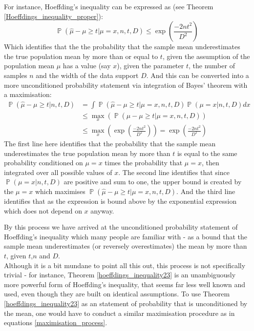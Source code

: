 \documentclass[12pt]{colt2020} %
\DeclareMathOperator{\p}{\mathbb{P}}
\begin{document}
For instance, Hoeffding's inequality can be expressed as (see Theorem \ref{Hoeffdings_inequality_proper}):
$$\p(\hat{\mu}-\mu\ge t|\mu=x,n,t,D)\le \exp\left(\frac{-2nt^2}{D^2}\right)$$
Which identifies that the the probability that the sample mean underestimates the true population mean by more than or equal to $t$, given the assumption of the population mean $\mu$ has a value (say $x$), given the parameter $t$, the number of samples $n$ and the width of the data support $D$.
And this can be converted into a more unconditioned probability statement via integration of Bayes' theorem with a maximisation:
\begin{align}\label{maximisation_process}\p(\hat{\mu}-\mu\ge t|n,t,D)& = \int\p(\hat{\mu}-\mu\ge t|\mu=x,n,t,D)\p(\mu=x|n,t,D)dx\nonumber\\
&\le \max_x\left(\p(\hat{\mu}-\mu\ge t|\mu=x,n,t,D)\right)\nonumber\\
&\le \max_x\left(\exp\left(\frac{-2nt^2}{D^2}\right)\right) = \exp\left(\frac{-2nt^2}{D^2}\right)\end{align}
The first line here identifies that the probability that the sample mean underestimates the true population mean by more than $t$ is equal to the same probability conditioned on $\mu=x$ times the probability that $\mu=x$, then integrated over all possible values of $x$.
The second line identifies that since $\p(\mu=x|n,t,D)$ are positive and sum to one, the upper bound is created by the $\mu=x$ which maximises $\p(\hat{\mu}-\mu\ge t|\mu=x,n,t,D)$.
And the third line identifies that as the expression is bound above by the exponential expression which does not depend on $x$ anyway. 

By this process we have arrived at the unconditioned probability statement of Hoeffding's inequality which many people are familiar with - as a bound that the sample mean underestimates (or reversely overestimates) the mean by more than $t$, given $t$,$n$ and $D$.\\

Although it is a bit mundane to point all this out, this process is not specifically trivial - for instance, Theorem \ref{hoeffdings_inequality23} is an unambiguously more powerful form of Hoeffding's inequality, that seems far less well known and used, even though they are built on identical assumptions. To use Theorem \ref{hoeffdings_inequality23} as an statement of probability that is unconditioned by the mean, one would have to conduct a similar maximisation procedure as in equations \eqref{maximisation_process}.\\
\end{document}
